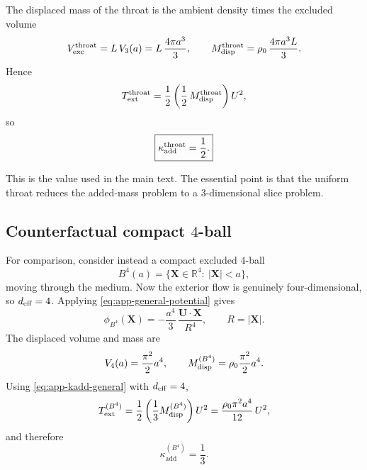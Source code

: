 \documentclass[11pt]{article}
\newcommand{\kadd}{\kappa_{\mathrm{add}}}
\begin{document}
The displaced mass of the throat is the ambient density times the excluded volume
\begin{equation}
V_{\rm exc}^{\rm throat}=L\,V_3(a)=L\,\frac{4\pi a^3}{3},
\qquad
M_{\rm disp}^{\rm throat}
=
\rho_0\,\frac{4\pi a^3L}{3}.
\label{eq:app-throat-disp}
\end{equation}
Hence
\begin{equation}
T_{\rm ext}^{\rm throat}
=
\frac12
\left(
\frac12\,M_{\rm disp}^{\rm throat}
\right)U^2,
\label{eq:app-throat-added-mass}
\end{equation}
so
\begin{equation}
\boxed{
\kadd^{\rm throat}=\frac12.
}
\label{eq:app-kadd-throat}
\end{equation}

This is the value used in the main text. The essential point is that the uniform throat
reduces the added-mass problem to a \(3\)-dimensional slice problem.

\subsection{Counterfactual compact \(4\)-ball}
\label{app:added-mass-bubble}

For comparison, consider instead a compact excluded \(4\)-ball
\begin{equation}
B^4(a)=\{\mathbf X\in\mathbb R^4:\ |\mathbf X|<a\},
\label{eq:app-b4-geometry}
\end{equation}
moving through the medium. Now the exterior flow is genuinely four-dimensional, so
\(d_{\rm eff}=4\). Applying \eqref{eq:app-general-potential} gives
\begin{equation}
\phi_{B^4}(\mathbf X)
=
-\frac{a^4}{3}\,
\frac{\mathbf U\!\cdot\!\mathbf X}{R^4},
\qquad
R=|\mathbf X|.
\label{eq:app-b4-potential}
\end{equation}
The displaced volume and mass are
\begin{equation}
V_4(a)=\frac{\pi^2}{2}a^4,
\qquad
M_{\rm disp}^{(B^4)}=\rho_0\frac{\pi^2}{2}a^4.
\label{eq:app-b4-disp}
\end{equation}
Using \eqref{eq:app-kadd-general} with \(d_{\rm eff}=4\),
\begin{equation}
T_{\rm ext}^{(B^4)}
=
\frac12
\left(
\frac13 M_{\rm disp}^{(B^4)}
\right)U^2
=
\frac{\rho_0\pi^2 a^4}{12}\,U^2,
\label{eq:app-b4-energy}
\end{equation}
and therefore
\begin{equation}
\boxed{
\kadd^{(B^4)}=\frac13.
}
\label{eq:app-kadd-b4}
\end{equation}
\end{document}
